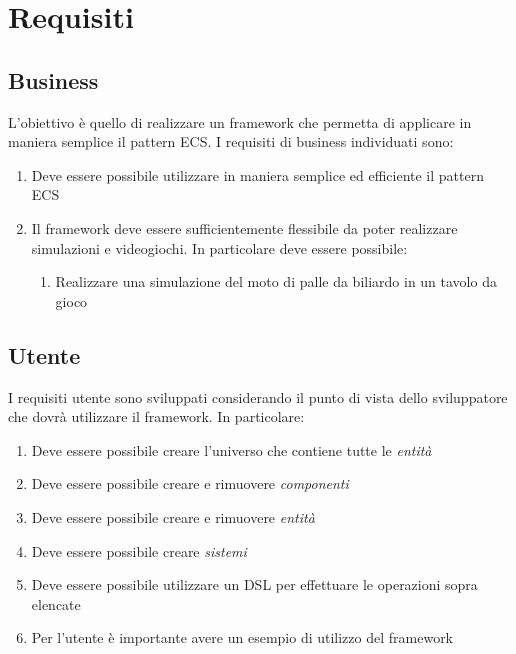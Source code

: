 \chapter{Requisiti}\label{ch:requisiti}

\section{Business}\label{sec:business}
L'obiettivo è quello di realizzare un framework che permetta di applicare in maniera semplice il pattern ECS\@.
I requisiti di business individuati sono:
\begin{enumerate}[label=\textbf{\ref{sec:business}.\arabic*}]
    \item \label{itm:b1} Deve essere possibile utilizzare in maniera semplice ed efficiente il pattern ECS
    \item \label{itm:b2} Il framework deve essere sufficientemente flessibile da poter realizzare simulazioni e videogiochi.
    In particolare deve essere possibile:
    \begin{enumerate}[label=\textbf{\ref{itm:b2}.\arabic*}]
        \item \label{itm:bb3} Realizzare una simulazione del moto di palle da biliardo in un tavolo da gioco
    \end{enumerate}
\end{enumerate}

\section{Utente}\label{sec:utente}
I requisiti utente sono sviluppati considerando il punto di vista dello sviluppatore che dovrà utilizzare il framework.
In particolare:
\begin{enumerate}[label=\textbf{\ref{sec:utente}.\arabic*}]
    \item \label{itm:u1} Deve essere possibile creare l'universo che contiene tutte le \textit{entità}
    \item \label{itm:u2} Deve essere possibile creare e rimuovere \textit{componenti}
    \item \label{itm:u3} Deve essere possibile creare e rimuovere \textit{entità}
    \item \label{itm:u4} Deve essere possibile creare \textit{sistemi}
    \item \label{itm:u5} Deve essere possibile utilizzare un DSL per effettuare le operazioni sopra elencate
    \item \label{itm:u6} Per l'utente è importante avere un esempio di utilizzo del framework
\end{enumerate}

